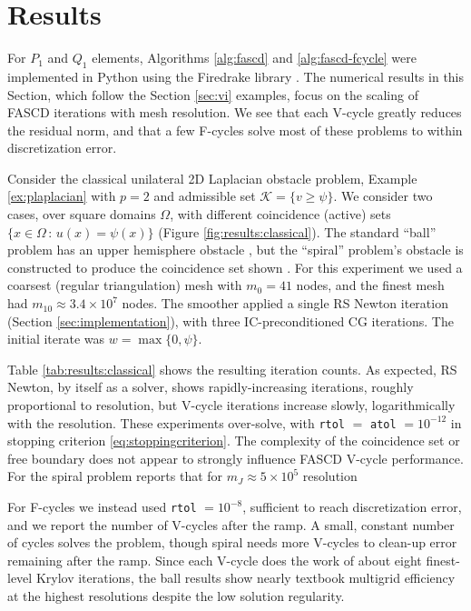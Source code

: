 \documentclass[review,hidelinks,onefignum,onetabnum]{siamart220329}
\newcommand{\elb}[1]{\todo[inline, color=blue!20]{EB: #1}}
\begin{document}
\section{Results} \label{sec:results}

For $P_1$ and $Q_1$ elements, Algorithms \ref{alg:fascd} and \ref{alg:fascd-fcycle} were implemented in Python using the Firedrake library \cite{Rathgeberetal2016}.  The numerical results in this Section, which follow the Section \ref{sec:vi} examples, focus on the scaling of FASCD iterations with mesh resolution.  We see that each V-cycle greatly reduces the residual norm, and that a few F-cycles solve most of these problems to within discretization error.

\begin{example} \label{ex:results:classical}
Consider the classical unilateral 2D Laplacian obstacle problem, Example \ref{ex:plaplacian} with $p=2$ and admissible set $\mathcal{K} = \{v \ge \psi\}$.  We consider two cases, over square domains $\Omega$, with different coincidence (active) sets $\{x\in\Omega \,:\, u(x)=\psi(x)\}$ (Figure \ref{fig:results:classical}).  The standard ``ball'' problem has an upper hemisphere obstacle \cite[Chapter 12]{Bueler2021}, but the ``spiral'' problem's obstacle is constructed to produce the coincidence set shown \cite[problem 7.1.1]{GraeserKornhuber2009}.  For this experiment we used a coarsest (regular triangulation) mesh with $m_0=41$ nodes, and the finest mesh had $m_{10} \approx 3.4 \times 10^7$ nodes.  The smoother applied a single RS Newton iteration (Section \ref{sec:implementation}), with three IC-preconditioned CG iterations.  The initial iterate was $w=\max\{0,\psi\}$.

Table \ref{tab:results:classical} shows the resulting iteration counts.  As expected, RS Newton, by itself as a solver, shows rapidly-increasing iterations, roughly proportional to resolution, but V-cycle iterations increase slowly, logarithmically with the resolution.  These experiments over-solve, with \texttt{rtol} $=$ \texttt{atol} $= 10^{-12}$ in stopping criterion \eqref{eq:stoppingcriterion}.  The complexity of the coincidence set or free boundary does not appear to strongly influence FASCD V-cycle performance.  For the spiral problem \cite{GraeserKornhuber2009} reports that for $m_J \approx 5\times 10^5$ resolution \elb{describe GK results}

\elb{asymp rate figure?}

For F-cycles we instead used \texttt{rtol} $= 10^{-8}$, sufficient to reach discretization error, and we report the number of V-cycles after the ramp.  A small, constant number of cycles solves the problem, though spiral needs more V-cycles to clean-up error remaining after the ramp.  Since each V-cycle does the work of about eight finest-level Krylov iterations, the ball results show nearly textbook multigrid efficiency at the highest resolutions despite the low solution regularity.
\end{example}
\end{document}
